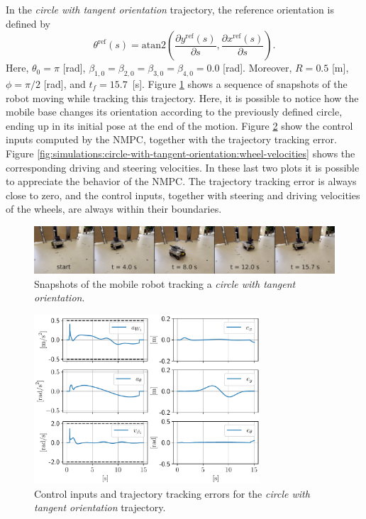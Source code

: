 In the \textit{circle with tangent orientation} trajectory, the reference orientation is defined by
\begin{equation}
    \theta^{\mathrm{ref}}(s) = \mathrm{atan2}\left(\frac{\partial y^{\mathrm{ref}}(s)}{\partial s}, \frac{\partial x^{\mathrm{ref}}(s)}{\partial s}\right).
    \label{eq:reference-tangent-orientation}
\end{equation}
Here, $\theta_0=\pi$ [rad], $\beta_{1,0}=\beta_{2,0}=\beta_{3,0}=\beta_{4,0}=0.0$ [rad]. Moreover, $R=0.5$ [m], $\phi=\pi/2$ [rad], and $t_f=15.7$~[s].
Figure \ref{fig:experiments:circle-with-tangent-orientation:snapshots} shows a sequence of snapshots of the robot moving while tracking this trajectory. Here, it is possible to notice how the mobile base changes its orientation according to the previously defined circle, ending up in its initial pose at the end of the motion. Figure \ref{fig:simulations:circle-with-tangent-orientation:inputs-and-errors} show the control inputs computed by the NMPC, together with the trajectory tracking error. Figure \ref{fig:simulations:circle-with-tangent-orientation:wheel-velocities} shows the corresponding driving and steering velocities. In these last two plots it is possible to appreciate the behavior of the NMPC. The trajectory tracking error is always close to zero, and the control inputs, together with steering and driving velocities of the wheels, are always within their boundaries.
\begin{figure}
    \centering
    \includegraphics[width=\textwidth]{figures/SWMR/simulations/circular_with_tangent_orientation/snapshots.jpeg}
    \caption{Snapshots of the mobile robot tracking a \textit{circle with tangent orientation}.}
    \label{fig:experiments:circle-with-tangent-orientation:snapshots}
\end{figure}
\begin{figure}
    \centering
    \includegraphics[width=0.75\textwidth]{figures/SWMR/simulations/circular_with_tangent_orientation/inputs_and_errors.pdf}
    \caption{Control inputs and trajectory tracking errors for the \textit{circle with tangent orientation} trajectory.}
    \label{fig:simulations:circle-with-tangent-orientation:inputs-and-errors}
\end{figure}
